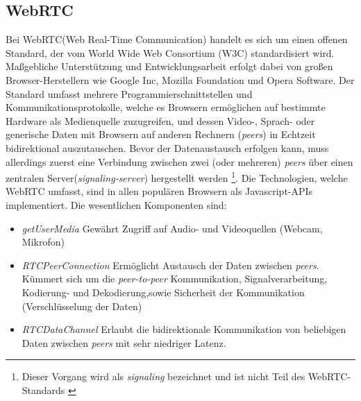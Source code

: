 \subsection{WebRTC}
\label{subsec:WebRTC}
Bei WebRTC(Web Real-Time Communication) handelt es sich um einen offenen Standard, der vom World Wide Web Consortium (W3C) standardisiert wird.
Maßgebliche Unterstützung und Entwicklungsarbeit erfolgt dabei von großen Browser-Herstellern wie Google Inc, Mozilla Foundation und Opera Software\parencite[Siehe Editors]{W3WebRTC}.
Der Standard umfasst mehrere Programmierschnittstellen und Kommunikationsprotokolle, welche es Browsern ermöglichen auf bestimmte
Hardware als Medienquelle zuzugreifen, und dessen Video-, Sprach- oder generische Daten mit Browsern auf anderen Rechnern (\textit{peers}) in Echtzeit bidirektional auszutauschen.
Bevor der Datenaustausch erfolgen kann, muss allerdings zuerst eine Verbindung zwischen zwei (oder mehreren) \textit{peers} über einen
zentralen Server(\textit{signaling-server}) hergestellt werden
\footnote{Dieser Vorgang wird als \textit{signaling} bezeichnet und ist nicht Teil des WebRTC-Standards \parencite{WebRTC2020GS}}.
Die Technologien, welche WebRTC umfasst, sind in allen populären Browsern als Javascript-APIs implementiert\parencite[Abschnitt \textit{Signaling}]{WebRTC2020}.
Die wesentlichen Komponenten sind:

\begin{itemize}
    \item \textit{getUserMedia} Gewährt Zugriff auf Audio- und Videoquellen (Webcam, Mikrofon)\parencite[Abschnitt 9]{W3WebRTC}
    \item \textit{RTCPeerConnection} Ermöglicht Austausch der Daten zwischen \textit{peers}\parencite[Abschnitt 4.4]{W3WebRTC}.
    Kümmert sich um die \textit{peer-to-peer} Kommunikation, Signalverarbeitung, Kodierung- und Dekodierung,sowie Sicherheit der Kommunikation (Verschlüsselung der Daten)
    \item \textit{RTCDataChannel} Erlaubt die bidirektionale Kommunikation von beliebigen Daten zwischen \textit{peers} mit sehr niedriger Latenz\parencite[Abschnitt 6]{W3WebRTC}.
\end{itemize}